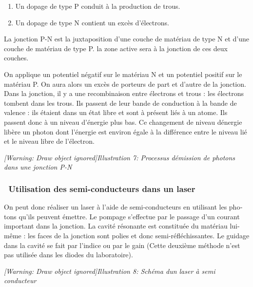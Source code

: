 \documentclass[12pt,twoside]{article}
\newcommand\liststyleLviii{%
\renewcommand\labelitemi{[25CF?]}
\renewcommand\labelitemii{[25CB?]}
\renewcommand\labelitemiii{[25A0?]}
\renewcommand\labelitemiv{[25CF?]}
}
\begin{document}
\liststyleLviii
\begin{enumerate}
\item Un dopage de type P conduit \`a la production de trous. 
\item Un dopage de type N contient un exc\`es d'\'electrons.
\end{enumerate}
La jonction P{}-N est la juxtaposition d'une couche de mat\'eriau de
type N et d'une couche de mat\'eriau de type P. la zone active sera \`a
la jonction de ces deux couches.

On applique un potentiel n\'egatif sur le mat\'eriau N et un potentiel
positif sur le mat\'eriau P. On aura alors un exc\`es de porteurs de
part et d'autre de la jonction. Dans la jonction, il y a une
recombinaison entre \'electrons et trous : les \'electrons
{\guillemotleft}tombent{\guillemotright} dans les trous. Ils passent de
leur bande de conduction \`a la bande de valence : ils \'etaient dans
un \'etat libre et sont \`a pr\'esent li\'es \`a un atome. Ils passent
donc \`a un niveau d'\'energie plus bas. Ce changement de niveau
d{\textquotesingle}\'energie lib\`ere un photon dont l'\'energie est
environ \'egale \`a la diff\'erence entre le niveau li\'e et le niveau
libre de l'\'electron.

\begin{minipage}{15.253cm}
{\itshape
[Warning: Draw object ignored]Illustration 7: Processus
d{\textquotesingle}\'emission de photons dans une jonction P{}-N}
\end{minipage}

\subsubsection[\ Utilisation des semi{}-conducteurs dans un
laser]{\ Utilisation des \foreignlanguage{english}{semi}{}-conducteurs
dans un laser}
\foreignlanguage{french}{On peut donc r\'ealiser un laser \`a l'aide de
}\foreignlanguage{english}{semi}\foreignlanguage{french}{{}-conducteurs
en utilisant les photons qu'ils peuvent \'emettre. Le pompage
s'effectue par le passage d'un courant important dans la jonction. La
cavit\'e r\'esonante est constitu\'ee du mat\'eriau lui{}-m\^eme : les
faces de la jonction sont polies et donc
}\foreignlanguage{english}{semi}\foreignlanguage{french}{{}-r\'efl\'echissantes.
Le guidage dans la cavit\'e se fait par l'indice ou par le gain (Cette
deuxi\`eme m\'ethode n'est pas utilis\'ee dans les diodes du
laboratoire).}

{
\begin{minipage}{15.253cm}
{\itshape
[Warning: Draw object ignored]Illustration 8: Sch\'ema
d{\textquotesingle}un laser \`a semi conducteur}
\end{minipage}}
\end{document}
